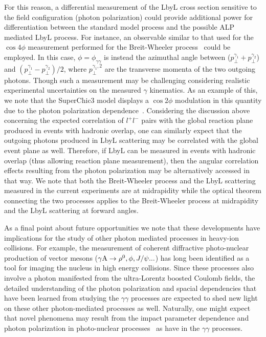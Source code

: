 \documentclass[twocolumn,epjc3]{svjour3}\sloppy
\begin{document}
For this reason, a differential measurement of the LbyL cross section sensitive to the field configuration (photon polarization) could provide additional power for differentiation between the standard model process and the possible ALP mediated LbyL process. For instance, an observable similar to that used for the $\cos4\phi$ measurement performed for the Breit-Wheeler process~\cite{liImpactParameterDependence2020,liProbingLinearPolarization2019,starcollaborationMeasurementMomentumAngular2021} could be employed. In this case, $\phi = \phi_{\gamma\gamma}$ is instead the azimuthal angle between ($p_\perp^{\gamma_1} + p_\perp^{\gamma_2}$) and $(p^{\gamma_1}_\perp - p^{\gamma_2}_\perp)/2$, where $p_\perp^{\gamma_1,2}$ are the transverse momenta of the two outgoing photons. Though such a measurement may be challenging considering realistic experimental uncertainties on the measured $\gamma$ kinematics. As an example of this, we note that the SuperChic3 model displays a $\cos2\phi$ modulation in this quantity due to the photon polarization dependence~\cite{SuperChic3}. Considering the discussion above concerning the expected correlation of $l^+l^-$ pairs with the global reaction plane produced in events with hadronic overlap, one can similarly expect that the outgoing photons produced in LbyL scattering may be correlated with the global event plane as well. Therefore, if LbyL can be measured in events with hadronic overlap (thus allowing reaction plane measurement), then the angular correlation effects resulting from the photon polarization may be alternatively accessed in that way. We note that both the Breit-Wheeler process and the LbyL scattering measured in the current experiments are at midrapidity while the optical theorem connecting the two processes applies to the Breit-Wheeler process at midrapidity and the LbyL scattering at forward angles. 

As a final point about future opportunities we note that these developments have implications for the study of other photon mediated processes in heavy-ion collisions. For example, the measurement of coherent diffractive photo-nuclear production of vector mesons ($\gamma {\rm A} \rightarrow \rho^0, \phi, J/\psi ...$) has long been identified as a tool for imaging the nucleus in high energy collisions. Since these processes also involve a photon manifested from the ultra-Lorentz boosted Coulomb fields, the detailed understanding of the photon polarization and spacial dependencies that have been learned from studying the $\gamma\gamma$ processes are expected to shed new light on these other photon-mediated processes as well. Naturally, one might expect that novel phenomena may result from the impact parameter dependence and photon polarization in photo-nuclear processes~\cite{zhaExploringDoubleslitInterference2021} as have in the $\gamma\gamma$ processes. 
\end{document}
